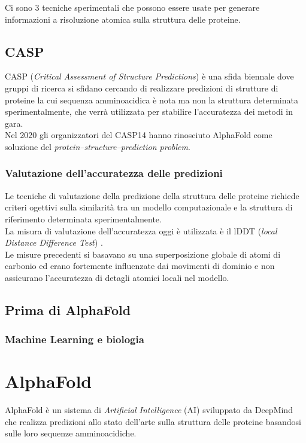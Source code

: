 Ci sono 3 tecniche sperimentali che possono essere usate per generare informazioni a risoluzione atomica sulla struttura delle proteine.

\section{CASP}
CASP (\textit{Critical Assessment of Structure Predictions}) è una sfida biennale dove gruppi di ricerca si sfidano cercando di realizzare predizioni di strutture di proteine la cui sequenza amminoacidica è nota ma non la struttura determinata sperimentalmente, che verrà utilizzata per stabilire l'accuratezza dei metodi in gara. \\

Nel 2020 gli organizzatori del CASP14 hanno rinosciuto AlphaFold come soluzione del \textit{protein–structure–prediction problem}. \\

\subsection{Valutazione dell'accuratezza delle predizioni}

Le tecniche di valutazione della predizione della struttura delle proteine richiede criteri ogettivi sulla similarità tra un modello computazionale e la struttura di riferimento determinata sperimentalmente.\\

La misura di valutazione dell'accuratezza oggi è utilizzata è il lDDT (\textit{local Distance
	Difference Test}) \cite{mariani2013lddt}. \\

Le misure precedenti si basavano su una superposizione globale di atomi di carbonio ed erano fortemente influenzate dai movimenti di dominio e non assicurano l'accuratezza di detagli atomici locali nel modello.

\section{Prima di AlphaFold}

\subsection{Machine Learning e biologia}

\chapter{AlphaFold}
AlphaFold è un sistema di \textit{Artificial Intelligence }(AI) sviluppato da DeepMind che realizza predizioni allo stato dell'arte sulla struttura delle proteine basandosi sulle loro sequenze amminoacidiche.

